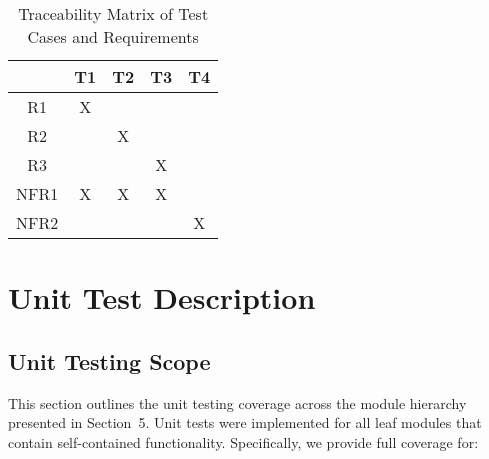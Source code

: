 \documentclass[12pt, titlepage]{article}
\begin{document}
\begin{table}[h!]
  \centering
  \begin{tabular}{|c|c|c|c|c|}
  \hline
    & T1 & T2 & T3 & T4 \\
  \hline
  R1        & X  &   &   &    \\ \hline
  R2        &   & X  &   &   \\ \hline
  R3        &   &   & X  &    \\ \hline
  NFR1      & X  & X  & X  &    \\ \hline
  NFR2      &   &   &   & X   \\ \hline
  \end{tabular}
  \caption{Traceability Matrix of Test Cases and Requirements}
  \label{Table:trace-test-req}
  \end{table}


\section{Unit Test Description}

\subsection{Unit Testing Scope}

This section outlines the unit testing coverage across the module hierarchy presented in Section~5. Unit tests were implemented for all leaf modules that contain self-contained functionality. Specifically, we provide full coverage for:
\end{document}
